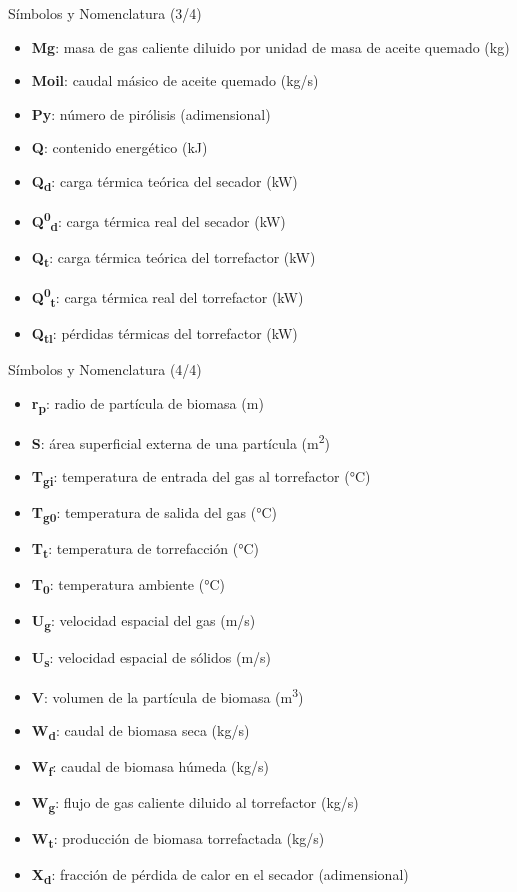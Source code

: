 \documentclass[main.tex]{subfiles}
\begin{document}
\begin{frame}{Símbolos y Nomenclatura (3/4)}
\footnotesize
\begin{itemize}
  \item \textbf{Mg}: masa de gas caliente diluido por unidad de masa de aceite quemado (kg)
  \item \textbf{Moil}: caudal másico de aceite quemado (kg/s)
  \item \textbf{Py}: número de pirólisis (adimensional)
  \item \textbf{Q}: contenido energético (kJ)
  \item \textbf{Q\textsubscript{d}}: carga térmica teórica del secador (kW)
  \item \textbf{Q\textsuperscript{0}\textsubscript{d}}: carga térmica real del secador (kW)
  \item \textbf{Q\textsubscript{t}}: carga térmica teórica del torrefactor (kW)
  \item \textbf{Q\textsuperscript{0}\textsubscript{t}}: carga térmica real del torrefactor (kW)
  \item \textbf{Q\textsubscript{tl}}: pérdidas térmicas del torrefactor (kW)
\end{itemize}
\end{frame}
\begin{frame}{Símbolos y Nomenclatura (4/4)}
\footnotesize
\begin{itemize}
  \item \textbf{r\textsubscript{p}}: radio de partícula de biomasa (m)
  \item \textbf{S}: área superficial externa de una partícula (m\textsuperscript{2})
  \item \textbf{T\textsubscript{gi}}: temperatura de entrada del gas al torrefactor (°C)
  \item \textbf{T\textsubscript{g0}}: temperatura de salida del gas (°C)
  \item \textbf{T\textsubscript{t}}: temperatura de torrefacción (°C)
  \item \textbf{T\textsubscript{0}}: temperatura ambiente (°C)
  \item \textbf{U\textsubscript{g}}: velocidad espacial del gas (m/s)
  \item \textbf{U\textsubscript{s}}: velocidad espacial de sólidos (m/s)
  \item \textbf{V}: volumen de la partícula de biomasa (m\textsuperscript{3})
  \item \textbf{W\textsubscript{d}}: caudal de biomasa seca (kg/s)
  \item \textbf{W\textsubscript{f}}: caudal de biomasa húmeda (kg/s)
  \item \textbf{W\textsubscript{g}}: flujo de gas caliente diluido al torrefactor (kg/s)
  \item \textbf{W\textsubscript{t}}: producción de biomasa torrefactada (kg/s)
  \item \textbf{X\textsubscript{d}}: fracción de pérdida de calor en el secador (adimensional)
\end{itemize}
\end{frame}
\end{document}
